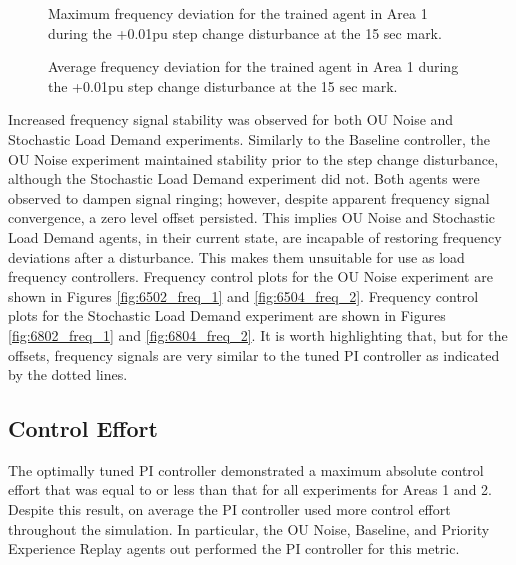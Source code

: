\begin{figure}[h]
	\begin{minipage}[t]{0.50\textwidth}
		\centering
		\resizebox{7cm}{!}{}
		\caption{Maximum frequency deviation for the trained agent in Area 1 during the +0.01pu step change disturbance at the 15 sec mark.}\label{fig:7203_max_freq}
	\end{minipage}
	\hspace{0.25cm}
	\begin{minipage}[t]{0.50\textwidth}
		\resizebox{7cm}{!}{}
		\caption{Average frequency deviation for the trained agent in Area 1 during the +0.01pu step change disturbance at the 15 sec mark.}\label{fig:7204_avg_freq}
	\end{minipage}
\end{figure}

Increased frequency signal stability was observed for both OU Noise and Stochastic Load Demand experiments. Similarly to the Baseline controller, the OU Noise experiment maintained stability prior to the step change disturbance, although the Stochastic Load Demand experiment did not. Both agents were observed to dampen signal ringing; however, despite apparent frequency signal convergence, a zero level offset persisted. This implies OU Noise and Stochastic Load Demand agents, in their current state, are incapable of restoring frequency deviations after a disturbance. This makes them unsuitable for use as load frequency controllers. Frequency control plots for the OU Noise experiment are shown in Figures \ref{fig:6502_freq_1} and \ref{fig:6504_freq_2}. Frequency control plots for the Stochastic Load Demand experiment are shown in Figures \ref{fig:6802_freq_1} and \ref{fig:6804_freq_2}. It is worth highlighting that, but for the offsets, frequency signals are very similar to the tuned PI controller as indicated by the dotted lines.

\subsection{Control Effort}
The optimally tuned PI controller demonstrated a maximum absolute control effort that was equal to or less than that for all experiments for Areas 1 and 2. Despite this result, on average the PI controller used more control effort throughout the simulation. In particular, the OU Noise, Baseline, and Priority Experience Replay agents out performed the PI controller for this metric.

